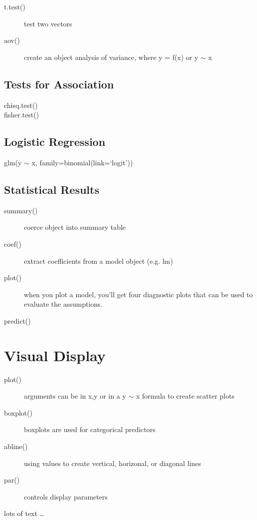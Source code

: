 \documentclass{article}\usepackage[]{graphicx}\usepackage[]{color}
\begin{document}
\begin{multicols}{3}
\begin{description}
\item[t.test()] test two vectors 
\item[aov()] create an object analysis of variance, where y = f(x) or y $\sim$ x
\end{description}

\subsection*{Tests for Association}

\begin{description}
\item[chisq.test()] 
\item[fisher.test()]
\end{description}

\subsection*{Logistic Regression}

\begin{description}
\item[glm(y $\sim$ x, family=binomial(link=`logit'))] 
\end{description}

\subsection*{Statistical Results}
\begin{description}
\item[summary()] coerce object into summary table
\item[coef()] extract coefficients from a model object (e.g. lm)
\item[plot()] when you plot a model, you'll get four diagnostic plots that can be used to evaluate the assumptions.
\item[predict()]
\end{description}

\section*{Visual Display}

\begin{description}
\item[plot()] arguments can be in x,y or in a y $\sim$ x formula to create scatter plots
\item[boxplot()] boxplots are used for categorical predictors
\item[abline()] using values to create vertical, horizonal, or diagonal lines
\item[par()] controls display parameters

\end{description}

  lots of text
  \ldots
\end{multicols}
\end{document}
